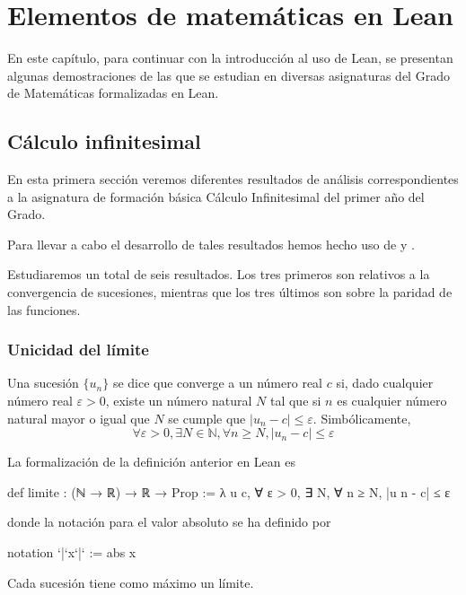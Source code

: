 \chapter{Elementos de matemáticas en Lean}\label{cap2}

En este capítulo, para continuar con la introducción al uso de Lean, se
presentan algunas demostraciones de las que se estudian en diversas
asignaturas del Grado de Matemáticas formalizadas en Lean.

\section{Cálculo infinitesimal}

En esta primera sección veremos diferentes resultados de análisis
correspondientes a la asignatura de formación básica Cálculo
Infinitesimal del primer año del Grado.

Para llevar a cabo el desarrollo de tales resultados hemos hecho uso
de \cite{ML} y \cite{LP}.

Estudiaremos un total de seis resultados. Los tres primeros son
relativos a la convergencia de sucesiones, mientras que los tres últimos
son sobre la paridad de las funciones.

\subsection{Unicidad del límite}

\begin{definicion}\label{limite}
  Una sucesión \(\{u_n\}\) se dice que converge a un número real \(c\)
  si, dado cualquier número real \(ε > 0\), existe un número natural
  \(N\) tal que si \(n\) es cualquier número natural mayor o igual que
  \(N\) se cumple que \(|u_n-c| ≤ ε\). Simbólicamente,
  \[∀ ε > 0, ∃ N ∈ ℕ, ∀ n ≥ N, |u_n-c| ≤ ε \]
\end{definicion}

La formalización de la definición anterior en Lean es
\begin{leancode}
def limite : (ℕ → ℝ) → ℝ → Prop :=
λ u c, ∀ ε > 0, ∃ N, ∀ n ≥ N, |u n - c| ≤ ε
\end{leancode}
donde la notación para el valor absoluto se ha definido por
\begin{leancode}
notation `|`x`|` := abs x
\end{leancode}

\begin{teorema}
Cada sucesión tiene como máximo un límite.
\end{teorema}


